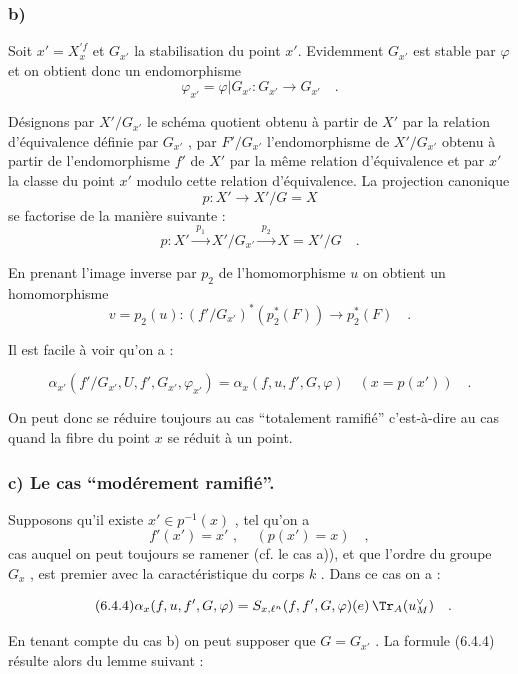 \subsubsection*{b)} Soit $x'=X_x^{\prime f}$ et $G_{x'}$ la stabilisation du point $x'$. Evidemment $G_{x'}$ est stable par $\varphi$ et on obtient donc un endomorphisme\[
\varphi_{x'} = \varphi|G_{x'} : G_{x'} \longrightarrow G_{x'} \quad .
\]

Désignons par $X'/G_{x'}$ le schéma quotient obtenu à partir de $X'$ par la relation d'équivalence définie par $G_{x'}$ , par $F'/G_{x'}$ l'endomorphisme de $X'/G_{x'}$ obtenu à partir de l'endomorphisme $f'$ de $X'$ par la même relation d'équivalence et par $x'$ la classe du point $x'$ modulo cette relation d'équivalence.
La
projection canonique
\[
p : X' \longrightarrow X'/G = X
\]
se factorise de la manière suivante :
\[
p : X' \xrightarrow{\;p_1\;} X'/G_{x'} \xrightarrow{\;p_2\;} X = X'/G \quad .
\]

En prenant l'image inverse par $p_2$ de l'homomorphisme $u$ on obtient un homomorphisme
\[
v = p_2(u) : (f'/G_{x'})^*(p_2^*(F)) \longrightarrow p_2^*(F) \quad .
\]

Il est facile à voir qu'on a :

\begin{equation}\tag{6.4.3}
\alpha_{x'}(f'/G_{x'}, U, f', G_{x'}, \varphi_{x'}) = \alpha_x(f,u, f', G, \varphi) \quad (x = p(x')) \quad .
\end{equation}

On peut donc se réduire toujours au cas ``totalement ramifié'' c'est-à-dire au cas quand la fibre du point $x$ se réduit à un point.

\subsubsection*{c) Le cas ``modérement ramifié''.} Supposons qu'il existe $x' \in p^{-1}(x)$ , tel qu'on a
\[
f'(x') = x' \text{ , } \quad (p(x') = x) \quad ,
\]
cas auquel on peut toujours se ramener (cf. le cas a)), et que l'ordre du groupe $G_x$ , est premier avec la caractéristique du corps $k$ . Dans ce cas on a :

\begin{equation}\tag{6.4.4}
\alpha_x(f,u, f', G, \varphi) = S_{x,\ell^n}(f, f', G, \varphi)(e) \, \Tr_A(u_M^\vee) \quad .
\end{equation}

En tenant compte du cas b) on peut supposer que $G = G_{x'}$ . La formule (6.4.4) résulte alors du lemme suivant :

